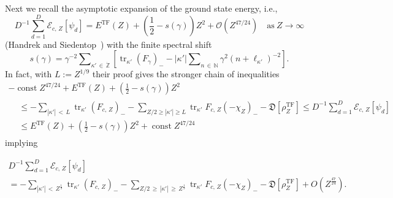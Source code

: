 \documentclass[AHL,Unicode,longabstracts,published]{cedram}
\newcommand{\TF}{\mathrm{TF}}
\DeclareMathOperator{\tr}{tr}
\DeclareMathOperator{\const}{const}
\newcommand*\nz{\mathbb{N}}
\newcommand*\gz{\mathbb{Z}}
\newcommand*\zp{\dot{\gz}}
\newcommand*\cE{\mathcal{E}}
\newcommand*\cO{\mathcal{O}}
\newcommand*\gD{\mathfrak{D}}
\begin{document}
Next we recall the asymptotic expansion of the ground state energy, i.e.,
\[
D^{-1}\sum_{d=1}^D\cE_{c,\,Z}\left[\psi_d\right] = E^{\TF}(Z) + \left(\frac12-s(\gamma)\right)Z^2+\cO\left(Z^{47/24}\right)
\quad \text{as}\ Z\to\infty
\]
(Handrek and Siedentop~\cite[Theorem~1]{HandrekSiedentop2015}) with the finite spectral shift
\begin{equation}\label{eq:spectralshift}
s(\gamma) =\gamma^{-2}\sum\nolimits_{{\kappa'}\,\in\,\zp}\left[\tr_{\kappa'}\left(F_\gamma\right)_{-} - \left|{\kappa'}\right|\sum\nolimits_{n\,\in\,\nz}\gamma^2\left(n+\ell_{\kappa'}\right)^{-2}\right].
\end{equation}
In fact, with $L:=Z^{1/9}$ their proof gives the stronger chain of inequalities
\begin{multline}\label{scottoperator}
-\const Z^{47/24} + E^{\TF}(Z)+\left(\frac12-s(\gamma)\right)Z^2\\
\begin{aligned}
&\leq -\sum_{\left|{\kappa'}\right|\,<\,L}\tr_{\kappa'} \left(F_{c,\,Z}\right)_{-} - \sum_{Z/2\geq |{\kappa'}|\geq L}\tr_{\kappa'} F_{c,\,Z}\left(-\chi_Z\right)_{-} -\gD\left[\rho_Z^{\TF}\right]\leq D^{-1}\sum_{d=1}^D\cE_{c,\,Z}\left[\psi_d\right] \\
&\leq E^{\TF}(Z)+\left(\frac12-s(\gamma)\right)Z^2+\const Z^{47/24}
\end{aligned}
\end{multline}
implying

\begin{multline}\label{wichtig}
D^{-1}\sum_{d=1}^D\cE_{c,\,Z}\left[\psi_d\right]\\
= -\sum_{\left|{\kappa'}\right|\,<\,Z^\frac19}\tr_{\kappa'} \left(F_{c,\,Z}\right)_{-} - \sum_{Z/2\,\geq\,\left|{\kappa'}\right|\,\geq\,Z^\frac19}\tr_{\kappa'} F_{c,\,Z}\left(-\chi_Z\right)_{-} -
\gD\left[\rho_Z^{\TF}\right] + O\left(Z^\frac{47}{24}\right).
\end{multline}
\end{document}

